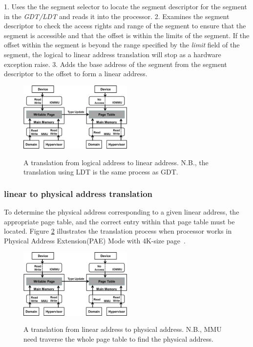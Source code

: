 1. Uses the the segment selector to locate the segment descriptor for the segment in the \emph{GDT/LDT} and reads it into the processor.
2. Examines the segment descriptor to check the access rights and range of the segment to ensure that the segment is accessible and that the offset is within the limits of the segment. If the offset within the segment is beyond the range specified by the \emph{limit} field of the segment, the logical to linear address translation will stop as a hardware exception raise.
3. Adds the base address of the segment from the segment descriptor to the offset to form a linear address.

\begin{figure}[ht]
\centering
\includegraphics[width=0.5\textwidth]{image/background/log2lin.png} \\
\caption{A translation from logical address to linear address. N.B., the translation using LDT is the same process as GDT.}
\label{fig:log2lin}
\end{figure}

\subsubsection{linear to physical address translation}
To determine the physical address corresponding to a given linear address, the appropriate page table, and the correct entry within that page table must be located. Figure \ref{fig:lin2phy} illustrates the translation process when processor works in Physical Address Extension(PAE) Mode with 4K-size page~\cite{x86}.

\begin{figure}[ht]
\centering
\includegraphics[width=0.5\textwidth]{image/background/lin2phy.png} \\
\caption{A translation from linear address to physical address. N.B., MMU need traverse the whole page table to find the physical address.}
\label{fig:lin2phy}
\end{figure}

